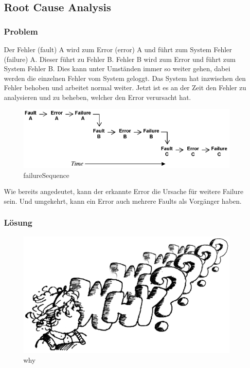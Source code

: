 \subsection{Root Cause Analysis}


\subsubsection*{Problem}


Der Fehler (fault) A wird zum Error (error) A und führt zum System Fehler (failure) A. Dieser führt zu Fehler B. Fehler B wird zum Error und führt zum System Fehler B. Dies kann unter Umständen immer so weiter gehen, dabei werden die einzelnen Fehler vom System geloggt. Das System hat inzwischen den Fehler behoben und arbeitet normal weiter. Jetzt ist es an der Zeit den Fehler zu analysieren und zu beheben, welcher den Error verursacht hat.

\begin{figure}[H]
	\centering
	\includegraphics[width=\textwidth]{content/faulttolerance/images/failureSequence.PNG}
	\caption{failureSequence}
\end{figure}


Wie bereits angedeutet, kann der erkannte Error die Ursache für weitere Failure sein. Und umgekehrt, kann ein Error auch mehrere Faults als Vorgänger haben.

\subsubsection*{Lösung}


\begin{figure}[H]
	\centering
	\includegraphics[width=\textwidth]{content/faulttolerance/images/why.png}
	\caption{why}
\end{figure}


